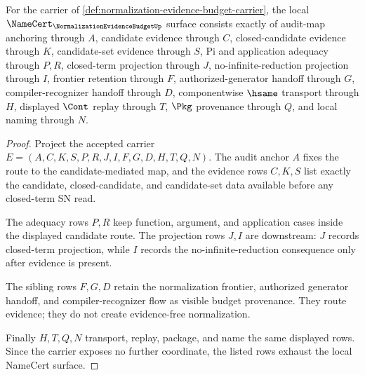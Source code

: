 \begin{theorem}
\label{thm:normalization-evidence-budget-namecert-obligations}
For the carrier of \autoref{def:normalization-evidence-budget-carrier}, the local $\NameCert_{\NormalizationEvidenceBudgetUp}$ surface consists exactly of audit-map anchoring through $A$, candidate evidence through $C$, closed-candidate evidence through $K$, candidate-set evidence through $S$, Pi and application adequacy through $P,R$, closed-term projection through $J$, no-infinite-reduction projection through $I$, frontier retention through $F$, authorized-generator handoff through $G$, compiler-recognizer handoff through $D$, componentwise $\hsame$ transport through $H$, displayed $\Cont$ replay through $T$, $\Pkg$ provenance through $Q$, and local naming through $N$.
\end{theorem}
\begin{proof}
Project the accepted carrier $E=(A,C,K,S,P,R,J,I,F,G,D,H,T,Q,N)$. The audit anchor $A$ fixes the route to the candidate-mediated map, and the evidence rows $C,K,S$ list exactly the candidate, closed-candidate, and candidate-set data available before any closed-term SN read.

The adequacy rows $P,R$ keep function, argument, and application cases inside the displayed candidate route. The projection rows $J,I$ are downstream: $J$ records closed-term projection, while $I$ records the no-infinite-reduction consequence only after evidence is present.

The sibling rows $F,G,D$ retain the normalization frontier, authorized generator handoff, and compiler-recognizer flow as visible budget provenance. They route evidence; they do not create evidence-free normalization.

Finally $H,T,Q,N$ transport, replay, package, and name the same displayed rows. Since the carrier exposes no further coordinate, the listed rows exhaust the local NameCert surface.
\end{proof}

